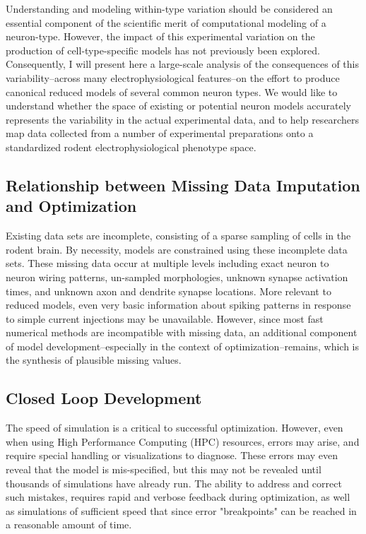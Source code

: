 Understanding and modeling within-type variation should be considered an essential component of the scientific merit of computational modeling of a neuron-type.
However, the impact of this experimental variation on the production of cell-type-specific models has not previously been explored.
Consequently, I will present here a large-scale analysis of the consequences of this variability--across many electrophysiological features--on the effort to produce canonical reduced models of several common neuron types.
We would like to understand whether the space of existing or potential neuron models accurately represents the variability in the actual experimental data, and to help researchers map data collected from a number of experimental preparations onto a standardized rodent electrophysiological phenotype space.

\subsection{Relationship between Missing Data Imputation and Optimization}
Existing data sets are incomplete, consisting of a sparse sampling of cells in the rodent brain. By necessity, models are constrained using these incomplete data sets.
These missing data occur at multiple levels including exact neuron to neuron wiring patterns, un-sampled morphologies, unknown synapse activation times, and unknown axon and dendrite synapse locations.
More relevant to reduced models, even very basic information about spiking patterns in response to simple current injections may be unavailable.
However, since most fast numerical methods are incompatible with missing data, an additional component of model development--especially in the context of optimization--remains, which is the synthesis of plausible missing values.

\subsection{Closed Loop Development}
The speed of simulation is a critical to successful optimization. However, even when using High Performance Computing (HPC) resources, errors may arise, and require special handling or visualizations to diagnose.  
These errors may even reveal that the model is mis-specified, but this may not be revealed until thousands of simulations have already run.
The ability to address and correct such mistakes, requires rapid and verbose feedback during optimization, as well as simulations of sufficient speed that since error "breakpoints" can be reached in a reasonable amount of time.

